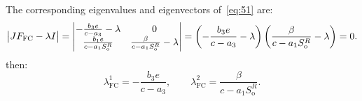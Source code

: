 \documentclass[
    8pt,
    aspectratio=1610,
    c,
    intlimits,
    leqno,
    professionalfonts,
]{beamer}
\begin{document}
\begin{frame}
	The corresponding eigenvalues and eigenvectors of~\eqref{eq:51}
	are:
	\begin{equation*}
		\begin{vmatrix}
			JF_{\text{FC}}-\lambda I
		\end{vmatrix}=
		\begin{vmatrix}
			-\frac{b_{3}e}{c-a_{3}}-\lambda        & 0                                             \\[.5\baselineskip]
			\frac{b_{1}e}{c-a_{1}S^{R}_{\text{o}}} & \frac{\beta}{c-a_{1}S^{R}_{\text{o}}}-\lambda
		\end{vmatrix}=
		\left(-\frac{b_{3}e}{c-a_{3}}-\lambda\right)
		\left(\frac{\beta}{c-a_{1}S^{R}_{\text{o}}}-\lambda\right)=
		0.
	\end{equation*}
	then:
	\begin{equation*}
		\lambda^{1}_{\text{FC}}=
		-\frac{b_{3}e}{c-a_{3}},\qquad
		\lambda^{2}_{\text{FC}}=
		\frac{\beta}{c-a_{1}S^{R}_{\text{o}}}.
	\end{equation*}
\end{frame}
\end{document}
